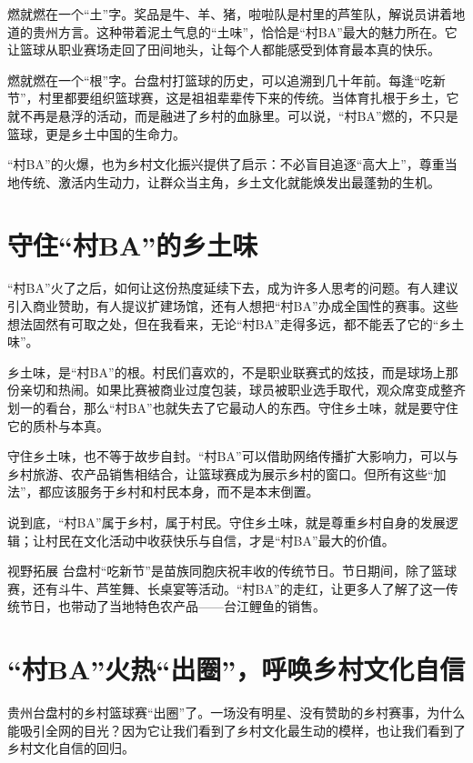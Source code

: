 燃就燃在一个“土”字。奖品是牛、羊、猪，啦啦队是村里的芦笙队，解说员讲着地道的贵州方言。这种带着泥土气息的“土味”，恰恰是“村BA”最大的魅力所在。它让篮球从职业赛场走回了田间地头，让每个人都能感受到体育最本真的快乐。

燃就燃在一个“根”字。台盘村打篮球的历史，可以追溯到几十年前。每逢“吃新节”，村里都要组织篮球赛，这是祖祖辈辈传下来的传统。当体育扎根于乡土，它就不再是悬浮的活动，而是融进了乡村的血脉里。可以说，“村BA”燃的，不只是篮球，更是乡土中国的生命力。

“村BA”的火爆，也为乡村文化振兴提供了启示：不必盲目追逐“高大上”，尊重当地传统、激活内生动力，让群众当主角，乡土文化就能焕发出最蓬勃的生机。

\clearpage
\section*{守住“村BA”的乡土味}

“村BA”火了之后，如何让这份热度延续下去，成为许多人思考的问题。有人建议引入商业赞助，有人提议扩建场馆，还有人想把“村BA”办成全国性的赛事。这些想法固然有可取之处，但在我看来，无论“村BA”走得多远，都不能丢了它的“乡土味”。

乡土味，是“村BA”的根。村民们喜欢的，不是职业联赛式的炫技，而是球场上那份亲切和热闹。如果比赛被商业过度包装，球员被职业选手取代，观众席变成整齐划一的看台，那么“村BA”也就失去了它最动人的东西。守住乡土味，就是要守住它的质朴与本真。

守住乡土味，也不等于故步自封。“村BA”可以借助网络传播扩大影响力，可以与乡村旅游、农产品销售相结合，让篮球赛成为展示乡村的窗口。但所有这些“加法”，都应该服务于乡村和村民本身，而不是本末倒置。

说到底，“村BA”属于乡村，属于村民。守住乡土味，就是尊重乡村自身的发展逻辑；让村民在文化活动中收获快乐与自信，才是“村BA”最大的价值。

\begin{quoteBox}{视野拓展}
台盘村“吃新节”是苗族同胞庆祝丰收的传统节日。节日期间，除了篮球赛，还有斗牛、芦笙舞、长桌宴等活动。“村BA”的走红，让更多人了解了这一传统节日，也带动了当地特色农产品——台江鲤鱼的销售。
\end{quoteBox}

\clearpage
\section*{“村BA”火热“出圈”，呼唤乡村文化自信}

贵州台盘村的乡村篮球赛“出圈”了。一场没有明星、没有赞助的乡村赛事，为什么能吸引全网的目光？因为它让我们看到了乡村文化最生动的模样，也让我们看到了乡村文化自信的回归。

